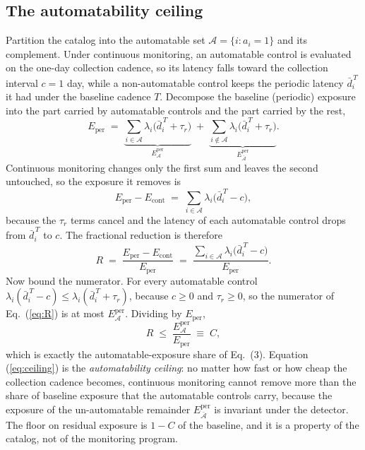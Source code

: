 \documentclass[journal]{IEEEtran}
\begin{document}
\subsection{The automatability ceiling}
Partition the catalog into the automatable set $\mathcal{A} = \{ i : a_i = 1 \}$ and its complement.
Under continuous monitoring, an automatable control is evaluated on the one-day collection cadence,
so its latency falls toward the collection interval $c = 1$ day, while a non-automatable control
keeps the periodic latency $\bar d_i^{\,T}$ it had under the baseline cadence $T$. Decompose the
baseline (periodic) exposure into the part carried by automatable controls and the part carried by
the rest,
\begin{equation}
\label{eq:split}
E_{\text{per}} \;=\; \underbrace{\sum_{i \in \mathcal{A}} \lambda_i \big( \bar d_i^{\,T} + \tau_r \big)}_{E_{\mathcal{A}}^{\text{per}}}
\;+\; \underbrace{\sum_{i \notin \mathcal{A}} \lambda_i \big( \bar d_i^{\,T} + \tau_r \big)}_{E_{\bar{\mathcal{A}}}^{\text{per}}} .
\end{equation}
Continuous monitoring changes only the first sum and leaves the second untouched, so the exposure it
removes is
\begin{equation}
\label{eq:removed}
E_{\text{per}} - E_{\text{cont}} \;=\; \sum_{i \in \mathcal{A}} \lambda_i \big( \bar d_i^{\,T} - c \big) ,
\end{equation}
because the $\tau_r$ terms cancel and the latency of each automatable control drops from
$\bar d_i^{\,T}$ to $c$. The fractional reduction is therefore
\begin{equation}
\label{eq:R}
R \;=\; \frac{E_{\text{per}} - E_{\text{cont}}}{E_{\text{per}}}
\;=\; \frac{\sum_{i \in \mathcal{A}} \lambda_i \big( \bar d_i^{\,T} - c \big)}{E_{\text{per}}}.
\end{equation}
Now bound the numerator. For every automatable control $\lambda_i (\bar d_i^{\,T} - c) \le \lambda_i
(\bar d_i^{\,T} + \tau_r)$, because $c \ge 0$ and $\tau_r \ge 0$, so the numerator of
Eq.~(\ref{eq:R}) is at most $E_{\mathcal{A}}^{\text{per}}$. Dividing by $E_{\text{per}}$,
\begin{equation}
\label{eq:ceiling}
R \;\le\; \frac{E_{\mathcal{A}}^{\text{per}}}{E_{\text{per}}} \;\equiv\; C ,
\end{equation}
which is exactly the automatable-exposure share of Eq.~(3). Equation (\ref{eq:ceiling}) is the
\emph{automatability ceiling}: no matter how fast or how cheap the collection cadence becomes,
continuous monitoring cannot remove more than the share of baseline exposure that the automatable
controls carry, because the exposure of the un-automatable remainder $E_{\bar{\mathcal{A}}}^{\text{per}}$
is invariant under the detector. The floor on residual exposure is $1 - C$ of the baseline, and it is
a property of the catalog, not of the monitoring program.
\end{document}
